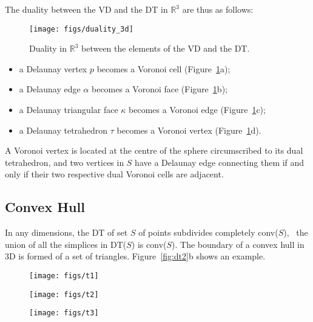 The duality between the VD and the DT in $\mathbb{R}^3$ are thus as follows: 
\begin{figure}
  \centering
  \texttt{[image: figs/duality\_3d]}
  \caption{Duality in $\mathbb{R}^{3}$ between the elements of the VD and the DT.}%
\label{fig:duality_3d}
\end{figure}
\begin{itemize}
  \item a Delaunay vertex $p$ becomes a Voronoi cell (Figure~\ref{fig:duality_3d}a); 
  \item a Delaunay edge $\alpha$ becomes a Voronoi face (Figure~\ref{fig:duality_3d}b);
  \item a Delaunay triangular face $\kappa$ becomes a Voronoi edge (Figure~\ref{fig:duality_3d}c);
  \item a Delaunay tetrahedron $\tau$ becomes a Voronoi vertex (Figure~\ref{fig:duality_3d}d). 
\end{itemize}
A Voronoi vertex is located at the centre of the sphere circumscribed to its dual tetrahedron, and two vertices in $S$ have a Delaunay edge connecting them if and only if their two respective dual Voronoi cells are adjacent.


\subsection{Convex Hull}
In any dimensions, the DT of set $S$ of points subdivides completely conv($S$), \ie\ the union of all the simplices in DT($S$) is conv($S$).
The boundary of a convex hull in 3D is formed of a set of triangles.
Figure~\ref{fig:dt2}b shows an example.
\begin{figure*}
  \centering
  \begin{subfigure}[b]{0.29\linewidth}
    \texttt{[image: figs/t1]}
    \caption{}
  \end{subfigure}%
  \qquad
  \begin{subfigure}[b]{0.29\linewidth}
    \texttt{[image: figs/t2]}
    \caption{}
  \end{subfigure}%
  \qquad
  \begin{subfigure}[b]{0.29\linewidth}
    \texttt{[image: figs/t3]}
    \caption{}
  \end{subfigure}%
  \caption{\textbf{(a)} A set of 1000 points randomly distributed in a cube. \textbf{(b)} Its convex hull. \textbf{(c)} The Delaunay tetrahedralisation of the points, `sliced' in the middle and the upper tetrahedra removed (to be able to visualise the interior).}%
\label{fig:dt2}
\end{figure*}


